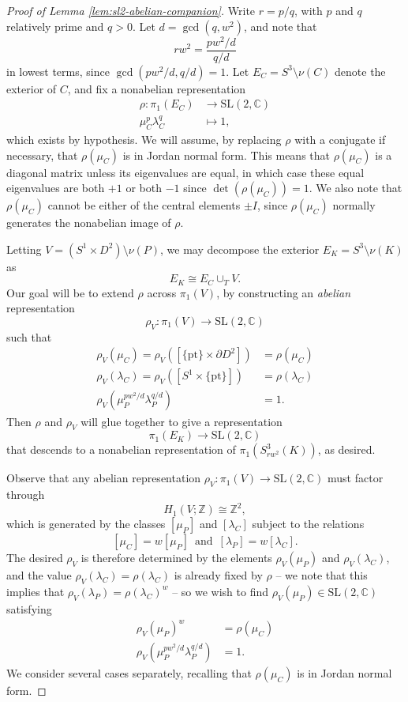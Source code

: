 \documentclass[11pt]{amsart}
\numberwithin{equation}{section}
\numberwithin{theorem}{section}
\theoremstyle{definition}
\newcommand{\Z}{\mathbb{Z}}
\newcommand{\C}{\mathbb{C}}
\newcommand\SL{\mathrm{SL}}
\newcommand{\pt}{\mathrm{pt}}
\begin{document}
\begin{proof}[Proof of Lemma \ref{lem:sl2-abelian-companion}]
Write $r = p/q$, with $p$ and $q$ relatively prime and $q > 0$.  Let $d=\gcd(q,w^2)$, and note that
\[ rw^2 = \frac{pw^2/d}{q/d} \]
in lowest terms, since $\gcd(pw^2/d, q/d) = 1$.  Let $E_C = S^3 \setminus \nu(C)$ denote the exterior of $C$, and fix a nonabelian representation
\begin{align*}
\rho: \pi_1(E_C) &\to \SL(2,\C) \\
\mu_C^p \lambda_C^q &\mapsto 1,
\end{align*}
which exists by hypothesis.  We will assume, by replacing $\rho$ with a conjugate if necessary, that $\rho(\mu_C)$ is in Jordan normal form.  This means that $\rho(\mu_C)$ is a diagonal matrix unless its eigenvalues are equal, in which case these equal eigenvalues are  both $+1$ or both $-1$  since $\det(\rho(\mu_C)) = 1$.  We also note that $\rho(\mu_C)$ cannot be either of the central elements $\pm I$, since $\rho(\mu_C)$  normally generates the nonabelian image of $\rho$.

Letting $V = (S^1\times D^2) \setminus \nu(P)$, we may decompose the exterior $E_K = S^3\setminus \nu(K)$ as
\[ E_K \cong E_C \cup_T V. \]
Our goal will be to extend $\rho$ across $\pi_1(V)$, by constructing an \emph{abelian} representation
\[ \rho_V: \pi_1(V) \to \SL(2,\C) \]
such that
\begin{align*}
\rho_V(\mu_C) = \rho_V( [\{\pt\} \times \partial D^2] ) &= \rho(\mu_C) \\
\rho_V(\lambda_C) = \rho_V( [S^1 \times \{\pt\}] ) &= \rho(\lambda_C) \\
\rho_V(\mu_P^{pw^2/d} \lambda_P^{q/d}) &= 1.
\end{align*}
Then $\rho$ and $\rho_V$ will glue together to give a representation \[\pi_1(E_K) \to \SL(2,\C)\] that descends to a nonabelian representation of $\pi_1(S^3_{rw^2}(K))$, as desired.

Observe that any abelian representation $\rho_V: \pi_1(V) \to \SL(2,\C)$ must factor through 
\[ H_1(V;\Z) \cong \Z^2, \]
which is generated by the classes $[\mu_P]$ and $[\lambda_C]$ subject to the relations
\[
[\mu_C] = w [\mu_P]\, \textrm{ and }\,
[\lambda_P] = w[\lambda_C].
\]
The desired $\rho_V$ is therefore determined by the elements $\rho_V(\mu_P)$ and $\rho_V(\lambda_C)$, and the value $\rho_V(\lambda_C) = \rho(\lambda_C)$ is already fixed by $\rho$ -- we note that this implies that $\rho_V(\lambda_P) = \rho(\lambda_C)^w$ -- so we wish to find $\rho_V(\mu_P) \in \SL(2,\C)$ satisfying
\begin{align*}
\rho_V(\mu_P)^w &= \rho(\mu_C) \\
\rho_V(\mu_P^{pw^2/d} \lambda_P^{q/d}) &= 1.
\end{align*}
We consider several cases separately, recalling that $\rho(\mu_C)$ is in Jordan normal form.


\end{proof}
\end{document}
